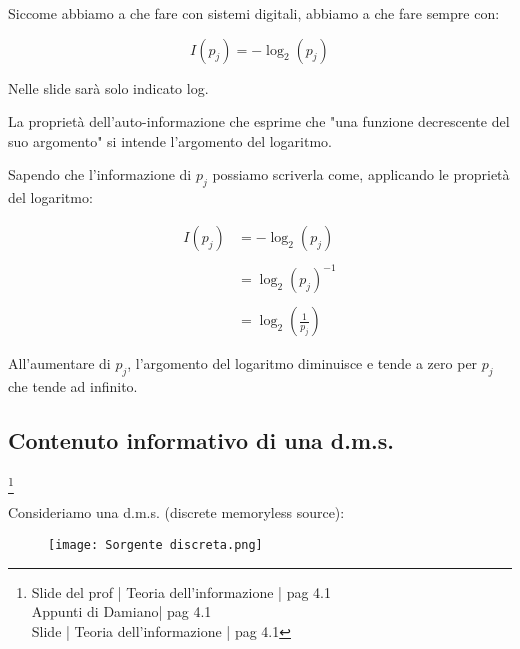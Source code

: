\begin{tcolorbox}
    Siccome abbiamo a che fare con sistemi digitali, abbiamo a che fare sempre con: 

    {
        \Large 
        \begin{equation}
            I (p_j) = - \log_2(p_j)
        \end{equation}
    }

    Nelle slide sarà solo indicato log. \newline 

    La proprietà dell'auto-informazione che esprime che "una funzione decrescente del suo argomento" si intende l'argomento del logaritmo. \newline 

    Sapendo che l'informazione di $p_j$ possiamo scriverla come, applicando le proprietà del logaritmo: 

    {
        \Large 
        \begin{equation}
            \begin{split}
              I (p_j) &= - \log_2(p_j)
              \\
              &\quad
              \\
              &= \log_2 (p_j)^{-1}
              \\
              &\quad
              \\
              &= \log_2 \left(\frac{1}{p_j} \right)
            \end{split}
        \end{equation}
    }
    
    All'aumentare di $p_j$, l'argomento del logaritmo diminuisce e tende a zero per $p_j$ che tende ad infinito. 
\end{tcolorbox}


\newpage 

\subsection{Contenuto informativo di una d.m.s.}
\footnote{Slide del prof | Teoria dell'informazione | pag 4.1 \\  
Appunti di Damiano| pag 4.1 \\
Slide | Teoria dell'informazione | pag 4.1} 

Consideriamo una d.m.s. (discrete memoryless source): 

\begin{figure}[h]
    \centering
    \texttt{[image: Sorgente discreta.png]}
\end{figure}

